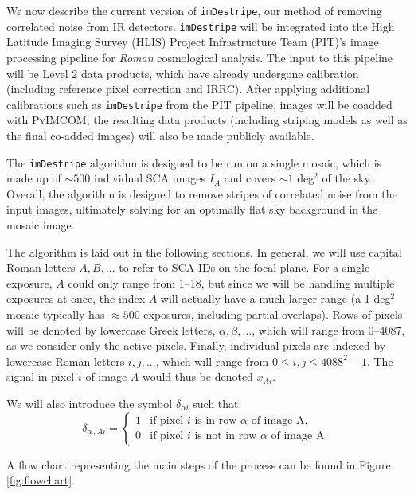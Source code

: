 \documentclass[]{pasj01}
\begin{document}
We now describe the current version of \texttt{imDestripe}, our method of removing correlated noise from IR detectors. \texttt{imDestripe} will be integrated into the High Latitude Imaging Survey (HLIS) Project Infrastructure Team (PIT)'s image processing pipeline for \textit{Roman} cosmological analysis. The input to this pipeline will be Level 2 data products, which have already undergone calibration (including reference pixel correction and IRRC). After applying additional calibrations such as \texttt{imDestripe} from the PIT pipeline, images will be coadded with \textsc{PyIMCOM}; the resulting data products (including striping models as well as the final co-added images) will also be made publicly available.

The \texttt{imDestripe} algorithm is designed to be run on a single mosaic, which is made up of $\sim 500$ individual SCA images $I_A$ and covers $\sim 1$ deg$^2$ of the sky. Overall, the algorithm is designed to remove stripes of correlated noise from the input images, ultimately solving for an optimally flat sky background in the mosaic image. 

The algorithm is laid out in the following sections. In general, we will use capital Roman letters $A, B, ...$ to refer to SCA IDs on the focal plane. For a single exposure, $A$ could only range from 1--18, but since we will be handling multiple exposures at once, the index $A$ will actually have a much larger range (a 1 deg$^2$ mosaic typically has $\approx 500$ exposures, including partial overlaps). Rows of pixels will be denoted by lowercase Greek letters, $\alpha, \beta,...$, which will range from 0--4087, as we consider only the active pixels. Finally, individual pixels are indexed by lowercase Roman letters $i, j, ...$, which will range from $0\le i, j \le 4088^2-1$. The signal in pixel $i$ of image $A$ would thus be denoted $x_{Ai}$. 

We will also introduce the symbol $\delta_{\alpha i}$ such that:
\begin{equation}
\delta_{\alpha\,,Ai} = \begin{cases}
1 & \text{if pixel } i \text{ is in row } \alpha \text{ of image A},\\
0  & \text{if pixel } i \text{ is not in row } \alpha \text{ of image A.}
\end{cases}
\end{equation}

A flow chart representing the main steps of the process can be found in Figure \ref{fig:flowchart}.
\end{document}
